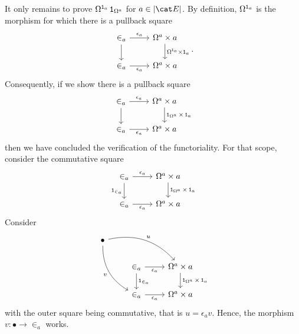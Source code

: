 It only remains to prove \(\Omega^{\operatorname{\mathtt 1}_a} \operatorname{\mathtt 1}_{\Omega^a}\) for \(a \in \abs{\cat E}\). By definition, \(\Omega^{\operatorname{\mathtt 1}_a}\) is the morphism for which there is a pullback square
\[\begin{tikzcd}
\in_a \ar[d] \ar["{\epsilon_a}", r] & \Omega^a \times a \ar["{\Omega^{\id_a} \times \id_a}", d] \\
\in_a \ar["{\epsilon_a}", r, swap] & \Omega^a \times a
\end{tikzcd} .\]
Consequently, if we show there is a pullback square
\[\begin{tikzcd}
\in_a \ar[d] \ar["{\epsilon_a}", r] & \Omega^a \times a \ar["{\id_{\Omega^a} \times \id_a}", d] \\
\in_a \ar["{\epsilon_a}", r, swap] & \Omega^a \times a
\end{tikzcd}\]
then we have concluded the verification of the functoriality. For that scope, consider the commutative square
\[\begin{tikzcd}
\in_a \ar["{\id_{\in_a}}", d, swap] \ar["{\epsilon_a}", r] & \Omega^a \times a \ar["{\id_{\Omega^a} \times \id_a}", d] \\
\in_a \ar["{\epsilon_a}", r, swap] & \Omega^a \times a
\end{tikzcd}\]
Consider
\[\begin{tikzcd}
\bullet \ar["u", drr, bend left] \ar["v", ddr, swap, bend right] \\
& \in_a \ar["{\id_{\in_a}}", d] \ar["{\epsilon_a}", r, swap] & \Omega^a \times a \ar["{\id_{\Omega^a} \times \id_a}", d] \\
& \in_a \ar["{\epsilon_a}", r, swap] & \Omega^a \times a
\end{tikzcd}\]
with the outer square being commutative, that is \(u = \epsilon_a v\). Hence, the morphism \(v : \bullet \to \in_a\) works.
